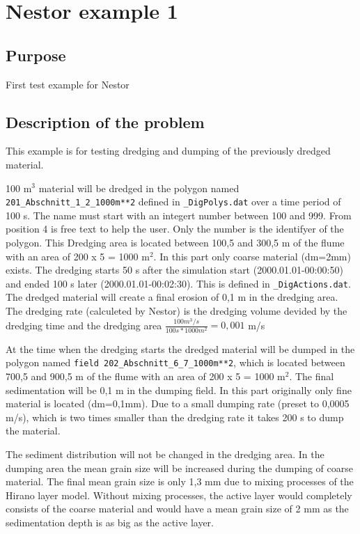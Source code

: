 \chapter{Nestor example 1}
%

%
\section{Purpose}
%
First test example for Nestor
%
\section{Description of the problem}
%
This example is for testing dredging and dumping of the previously dredged material.

100 m$^3$ material will be dredged in the polygon named \texttt{201\_Abschnitt\_1\_2\_1000m**2}  defined in \texttt{\_DigPolys.dat} over a time period of 100 s.
The name must start with an integert number between 100 and 999. From position 4 is free text to help the user.
Only the number is the identifyer of the polygon. This Dredging area is located between 100,5 and 300,5 m of the flume with an area of 200 x 5 = 1000 m$^2$. In this part only
coarse material (dm=2mm) exists.
The dredging starts 50 s after the simulation start (2000.01.01-00:00:50) and ended 100 s later
(2000.01.01-00:02:30). This is defined in \texttt{\_DigActions.dat}.
The dredged material will create a final erosion of 0,1 m in the dredging area.
The dredging rate (calculeted by Nestor) is the dredging volume devided by the dredging time and the dredging area
$\frac{100 m^3/s}{100 s*1000 m^2}=0,001$ m/s

At the time when the dredging starts the dredged material will
be dumped in the polygon named \texttt{field 202\_Abschnitt\_6\_7\_1000m**2}, which is located between 700,5 and 900,5 m of the flume
with an area of 200 x 5 = 1000 m$^2$. The final sedimentation will be 0,1 m in the dumping field.
In this part originally only fine material is located (dm=0,1mm).
Due to a small dumping rate (preset to 0,0005 m/s), which is two times smaller than the dredging rate it takes 200 s to dump the material.

The sediment distribution will not be changed in the dredging area. In the
dumping area the mean grain size will be increased during the dumping of coarse material.
The final mean grain size is only 1,3 mm due to mixing processes of the Hirano layer model.
Without mixing processes, the active layer would completely consists of the coarse material and would have
a mean grain size of 2 mm as the sedimentation depth is as big as the active layer.

